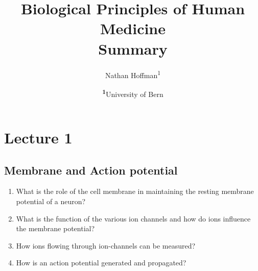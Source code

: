 \documentclass[
	a4paper, %
	10pt, %
	unnumberedsections, %
	twoside, %
	onecolumn,
]{LTJournalArticle}
\title{Biological Principles of Human Medicine\\ Summary} %
\author{%
	Nathan Hoffman\textsuperscript{1}
}
\date{\footnotesize\textsuperscript{\textbf{1}}University of Bern\\ }
\begin{document}
\maketitle %

\section{Lecture 1}
\subsection{Membrane and Action potential}
\begin{enumerate}
	\item What is the role of the cell membrane in maintaining the resting membrane potential of a neuron?
	
	\item What is  the function of the various ion channels and how do ions influence the membrane potential?
	
	\item How ions flowing through ion-channels can be measured?
	
	\item How is an action potential generated and propagated?
\end{enumerate}



\printbibliography %

\end{document}
